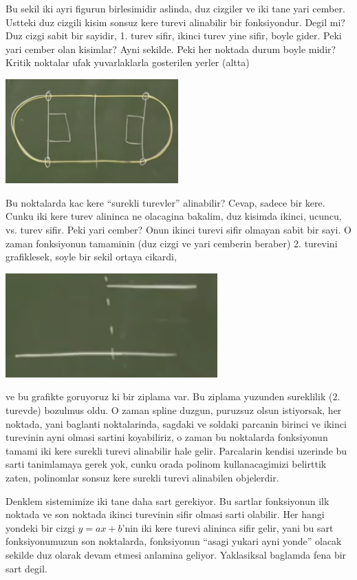\documentclass[12pt,fleqn]{article}\usepackage{../common}
\begin{document}
Bu sekil iki ayri figurun birlesimidir aslinda, duz cizgiler ve iki tane
yari cember. Ustteki duz cizgili kisim sonsuz kere turevi alinabilir bir
fonksiyondur. Degil mi? Duz cizgi sabit bir sayidir, 1. turev sifir, ikinci
turev yine sifir, boyle gider. Peki yari cember olan kisimlar? Ayni
sekilde. Peki her noktada durum boyle midir? Kritik noktalar ufak
yuvarlaklarla gosterilen yerler (altta)

\includegraphics[height=4cm]{spline7.png}

Bu noktalarda kac kere ``surekli turevler'' alinabilir? Cevap, sadece bir
kere. Cunku iki kere turev alininca ne olacagina bakalim, duz kisimda
ikinci, ucuncu, vs. turev sifir. Peki yari cember? Onun ikinci turevi sifir
olmayan sabit bir sayi. O zaman fonksiyonun tamaminin (duz cizgi ve yari
cemberin beraber) 2. turevini grafiklesek, soyle bir sekil ortaya cikardi,

\includegraphics[height=4cm]{spline8.png}

ve bu grafikte goruyoruz ki bir ziplama var. Bu ziplama yuzunden sureklilik
(2. turevde) bozulmus oldu.
O zaman spline duzgun, puruzsuz olsun istiyorsak, her noktada, yani
baglanti noktalarinda, sagdaki ve soldaki parcanin birinci ve ikinci
turevinin ayni olmasi sartini koyabiliriz, o zaman bu noktalarda
fonksiyonun tamami iki kere surekli turevi alinabilir hale
gelir. Parcalarin kendisi uzerinde bu sarti tanimlamaya gerek yok, cunku
orada polinom kullanacagimizi belirttik zaten, polinomlar sonsuz kere
surekli turevi alinabilen objelerdir. 

Denklem sistemimize iki tane daha sart gerekiyor. Bu sartlar fonksiyonun
ilk noktada ve son noktada ikinci turevinin sifir olmasi sarti
olabilir. Her hangi yondeki bir cizgi $y = ax + b$'nin iki kere turevi
alininca sifir gelir, yani bu sart fonksiyonumuzun son noktalarda,
fonksiyonun ``asagi yukari ayni yonde'' olacak sekilde duz olarak devam
etmesi anlamina geliyor. Yaklasiksal baglamda fena bir sart degil. 
\end{document}
